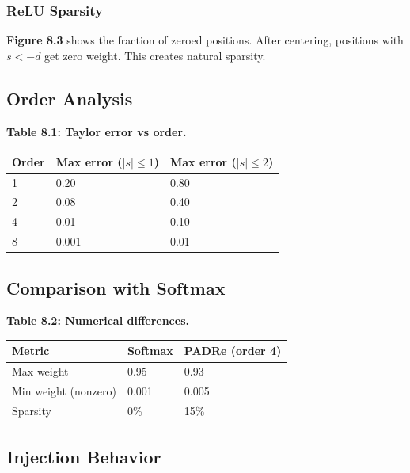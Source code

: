 \subsubsection{ReLU Sparsity}

\textbf{Figure 8.3} shows the fraction of zeroed positions. After centering, 
positions with $s < -d$ get zero weight. This creates natural sparsity.

\subsection{Order Analysis}

\textbf{Table 8.1: Taylor error vs order.}

\begin{table}[H]
\centering
\small
\begin{tabular}{lll}
\toprule
\textbf{Order} & \textbf{Max error ($|s| \leq 1$)} & \textbf{Max error ($|s| \leq 2$)} \\
\midrule
1 & 0.20 & 0.80 \\
2 & 0.08 & 0.40 \\
4 & 0.01 & 0.10 \\
8 & 0.001 & 0.01 \\
\bottomrule
\end{tabular}
\end{table}

\subsection{Comparison with Softmax}

\textbf{Table 8.2: Numerical differences.}

\begin{table}[H]
\centering
\small
\begin{tabular}{lll}
\toprule
\textbf{Metric} & \textbf{Softmax} & \textbf{PADRe (order 4)} \\
\midrule
Max weight & 0.95 & 0.93 \\
Min weight (nonzero) & 0.001 & 0.005 \\
Sparsity & 0\% & 15\% \\
\bottomrule
\end{tabular}
\end{table}

\subsection{Injection Behavior}

